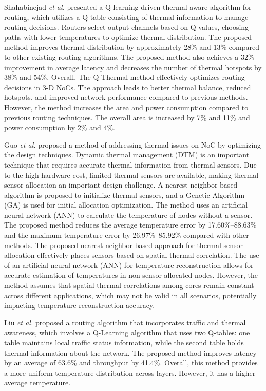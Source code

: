 \documentclass[conference]{IEEEtran}
\begin{document}
Shahabinejad \textit{et al.} \cite{2} presented a Q-learning driven thermal-aware algorithm for routing, which utilizes a Q-table consisting of thermal information to manage routing decisions. Routers select output channels based on Q-values, choosing paths with lower temperatures to optimize thermal distribution. The proposed method improves thermal distribution by approximately 28\% and 13\% compared to other existing routing algorithms. The proposed method also achieves a 32\% improvement in average latency and decreases the number of thermal hotspots by 38\% and 54\%. Overall, The Q-Thermal method effectively optimizes routing decisions in 3-D NoCs. The approach leads to better thermal balance, reduced hotspots, and improved network performance compared to previous methods. However, the method increases the area and power consumption compared to previous routing techniques. The overall area is increased by 7\% and 11\% and power consumption by 2\% and 4\%.

Guo \textit{et al.} \cite{3} proposed a method of addressing thermal issues on NoC by optimizing the design techniques. Dynamic thermal management (DTM) is an important technique that requires accurate thermal information from thermal sensors. Due to the high hardware cost, limited thermal sensors are available, making thermal sensor allocation an important design challenge. A nearest-neighbor-based algorithm is proposed to initialize thermal sensors, and a Genetic Algorithm (GA) is used for initial allocation optimization. The method uses an artificial neural network (ANN) to calculate the temperature of nodes without a sensor. The proposed method reduces the average temperature error by 17.60\%–88.63\% and the maximum temperature error by 26.97\%–85.92\% compared with other methods. The proposed nearest-neighbor-based approach for thermal sensor allocation effectively places sensors based on spatial thermal correlation. The use of an artificial neural network (ANN) for temperature reconstruction allows for accurate estimation of temperatures in non-sensor-allocated nodes. However, the method assumes that spatial thermal correlations among cores remain constant across different applications, which may not be valid in all scenarios, potentially impacting temperature reconstruction accuracy.

Liu \textit{et al.}\cite{4} proposed a routing algorithm that incorporates traffic and thermal awareness, which involves a Q-Learning algorithm that uses two Q-tables: one table maintains local traffic status information, while the second table holds thermal information about the network. The proposed method improves latency by an average of 63.6\% and throughput by 41.4\%. Overall, this method provides a more uniform temperature distribution across layers. However, it has a higher average temperature.
\end{document}
